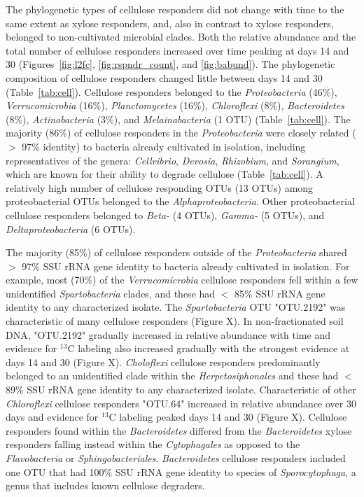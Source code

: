 The phylogenetic types of cellulose responders did not change with time to the
same extent as xylose responders, and, also in contrast to xylose responders,
belonged to non-cultivated microbial clades. Both the relative abundance and
the total number of cellulose responders increased over time peaking at days 14
and 30 (Figures~\ref{fig:l2fc}, \ref{fig:rspndr_count}, and \ref{fig:babund}). The phylogenetic composition of cellulose
responders changed little between days 14 and 30 (Table~\ref{tab:cell}). Cellulose
responders belonged to the \textit{Proteobacteria} (46\%),
\textit{Verrucomicrobia} (16\%), \textit{Planctomycetes} (16\%),
\textit{Chloroflexi} (8\%), \textit{Bacteroidetes} (8\%),
\textit{Actinobacteria} (3\%), and \textit{Melainabacteria} (1 OTU) (Table~\ref{tab:cell}).
The majority (86\%) of cellulose responders in the \textit{Proteobacteria}
were closely related ($>$ 97\% identity) to bacteria already cultivated in
isolation, including representatives of the genera: \textit{Cellvibrio},
\textit{Devosia}, \textit{Rhizobium}, and \textit{Sorangium}, which are
known for their ability to degrade cellulose (Table~\ref{tab:cell}).
A relatively high number of cellulose responding OTUs (13 OTUs) among
proteobacterial OTUs belonged to the \textit{Alphaproteobacteria}. Other
proteobacterial cellulose responders belonged to \textit{Beta-} (4 OTUs),
\textit{Gamma-} (5 OTUs), and \textit{Deltaproteobacteria} (6 OTUs). 

The majority (85\%) of cellulose responders outside of the
\textit{Proteobacteria} shared  $>$ 97\% SSU rRNA gene identity to bacteria
already cultivated in isolation. For example, most (70\%) of the
\textit{Verrucomicrobia} cellulose responders fell within a few unidentified
\textit{Spartobacteria} clades, and these had $<$ 85\% SSU rRNA gene identity
to any characterized isolate. The \textit{Spartobacteria} OTU "OTU.2192" was
characteristic of many cellulose responders (Figure X). In non-fractionated
soil DNA, "OTU.2192" gradually increased in relative abundance with time and
evidence for $^{13}$C labeling also increased gradually with the strongest evidence
at days 14 and 30 (Figure X). \textit{Choloflexi} cellulose responders
predominantly belonged to an unidentified clade within the
\textit{Herpetosiphonales} and these had $<$ 89\% SSU rRNA gene identity to any
characterized isolate. Characteristic of other \textit{Chloroflexi} cellulose
responders "OTU.64" increased in relative abundance over 30 days and evidence
for $^{13}$C labeling peaked days 14 and 30 (Figure X). Cellulose responders found
within the \textit{Bacteroidetes} differed from the \textit{Bacteroidetes}
xylose responders falling instead within the \textit{Cytophagales} as opposed
to the \textit{Flavobacteria} or \textit{Sphingobacteriales}.
\textit{Bacteroidetes} cellulose responders included one OTU that had 100\% SSU
rRNA gene identity to species of \textit{Sporocytophaga}, a genus that includes
known cellulose degraders.

